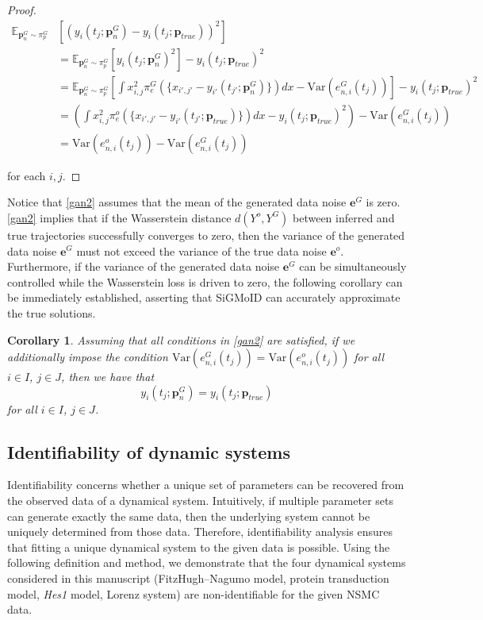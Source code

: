 \documentclass[letterpaper]{article} %
\theoremstyle{thmstyleone}%
\newtheorem{corollary}{Corollary}
\theoremstyle{thmstyletwo}%
\theoremstyle{thmstylethree}%
\begin{document}
\begin{proof}
\begin{align*}
\mathbb{E}_{\mathbf{p}_{n}^{G} \sim \pi_{p}^{G}}&[(y_{i}(t_{j};\mathbf{p}_{n}^{G})-y_{i}(t_{j};\mathbf{p}_{true}))^{2}]\\
&= \mathbb{E}_{\mathbf{p}_{n}^{G} \sim \pi_{p}^{G}}[y_{i}(t_{j};\mathbf{p}_{n}^{G})^{2}]-y_{i}(t_{j};\mathbf{p}_{true})^{2} \\
&= \mathbb{E}_{\mathbf{p}_{n}^{G} \sim \pi_{p}^{G}}[\int x_{i,j}^{2}\pi_{e}^{G}(\{x_{i',j'}-y_{i'}(t_{j'};\mathbf{p}_{n}^{G})\})dx - \text{Var}(e_{n,i}^{G}(t_{j}))]-y_{i}(t_{j};\mathbf{p}_{true})^{2} \\ 
&= (\int x_{i,j}^{2}\pi_{e}^{o}(\{x_{i',j'}-y_{i'}(t_{j'};\mathbf{p}_{true})\})dx - y_{i}(t_{j};\mathbf{p}_{true})^{2}) - \text{Var}(e_{n,i}^{G}(t_{j})) \\ 
&= \text{Var}(e_{n,i}^{o}(t_{j})) - \text{Var}(e_{n,i}^{G}(t_{j}))
\end{align*}

for each $i,j$.
\end{proof}

Notice that \cref{gan2} assumes that the mean of the generated data noise $\mathbf{e}^{G}$ is zero. \cref{gan2} implies that if the Wasserstein distance $d(Y^{o},Y^{G})$ between inferred and true trajectories successfully converges to zero, then the variance of the generated data noise $\mathbf{e}^{G}$ must not exceed the variance of the true data noise $\mathbf{e}^{o}$. Furthermore, if the variance of the generated data noise $\mathbf{e}^{G}$ can be simultaneously controlled while the Wasserstein loss is driven to zero, the following corollary can be immediately established, asserting that SiGMoID can accurately approximate the true solutions.

\begin{corollary}\label{gan3} Assuming that all conditions in \cref{gan2} are satisfied, if we additionally impose the condition $\displaystyle \text{Var}(e_{n,i}^{G}(t_{j}))=\text{Var}(e_{n,i}^{o}(t_{j}))$ for all $i \in I$, $j \in J$, then we have that \[\displaystyle y_{i}(t_{j};\mathbf{p}_{n}^{G}) = y_{i}(t_{j};\mathbf{p}_{true})\] for all $i \in I$, $j \in J$.
\end{corollary}

\subsection{Identifiability of dynamic systems}
Identifiability concerns whether a unique set of parameters can be recovered from the observed data of a dynamical system. Intuitively, if multiple parameter sets can generate exactly the same data, then the underlying system cannot be uniquely determined from those data. Therefore, identifiability analysis ensures that fitting a unique dynamical system to the given data is possible. Using the following definition and method, we demonstrate that the four dynamical systems considered in this manuscript (FitzHugh–Nagumo model, protein transduction model, \textit{Hes1} model, Lorenz system) are non-identifiable for the given  NSMC data.
\end{document}
